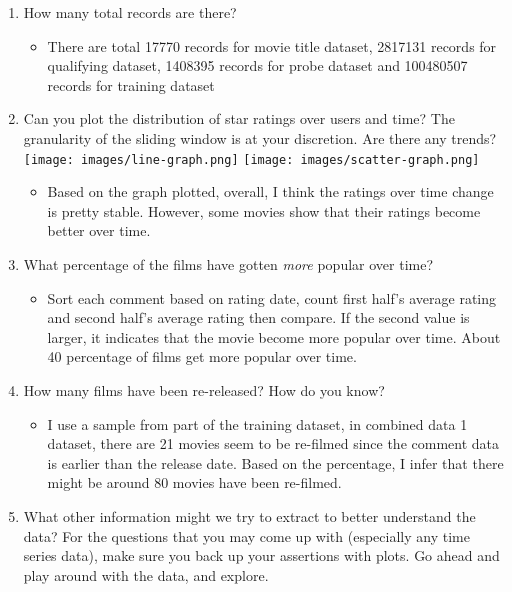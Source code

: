 \documentclass[paper=a4, fontsize=11pt]{scrartcl} %
\begin{document}
\begin{enumerate}
    \item How many total records are there?
        \begin{itemize}
            \item There are total 17770 records for movie title dataset, 2817131 records for qualifying dataset, 1408395 records for probe dataset and 100480507 records for training dataset
        \end{itemize}
    \item Can you plot the distribution of star ratings over users and time? The granularity of the sliding window is at your discretion. Are there any trends?\newline
    \texttt{[image: images/line-graph.png]}\newline
    \texttt{[image: images/scatter-graph.png]}\newline
        \begin{itemize}
            \item Based on the graph plotted, overall, I think the ratings over time change is pretty stable. However, some movies show that their ratings become better over time.
        \end{itemize}
    \item What percentage of the films have gotten \emph{more} popular over time?
        \begin{itemize}
            \item Sort each comment based on rating date, count first half's average rating and second half's average rating then compare. If the second value is larger, it indicates that the movie become more popular over time. About 40 percentage of films get more popular over time.
        \end{itemize}
    \item How many films have been re-released? How do you know?
        \begin{itemize}
            \item I use a sample from part of the training dataset, in combined data 1 dataset, there are 21 movies seem to be re-filmed since the comment data is earlier than the release date. Based on the percentage, I infer that there might be around 80 movies have been re-filmed.   
        \end{itemize}
    \item What other information might we try to extract to better understand the data? For the questions that you may come up with (especially any time series data), make sure you back up your assertions with plots. Go ahead and play around with the data, and explore. 

\end{enumerate}
\end{document}
